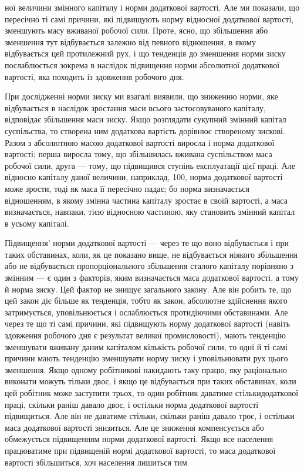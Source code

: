 ної величини змінного капіталу і норми додаткової вартості. Але ми показали, що пересічно ті самі
причини, які підвищують норму відносної додаткової вартості, зменшують масу вживаної робочої сили.
Проте, ясно, що збільшення або зменшення тут відбувається залежно від певного відношення, в якому
відбувається цей протилежний рух, і що тенденція до зменшення норми зиску послаблюється зокрема в
наслідок підвищення норми абсолютної додаткової вартості, яка походить із здовження робочого дня.

При дослідженні норми зиску ми взагалі виявили, що зниженню норми, яке відбувається в наслідок
зростання маси всього застосовуваного капіталу, відповідає збільшення маси зиску. Якщо розглядати
сукупний змінний капітал суспільства, то
створена ним додаткова вартість дорівнює створеному зискові. Разом з абсолютною масою додаткової
вартості виросла і норма додаткової вартості; перша виросла тому, що збільшилась вживана
суспільством маса робочої сили, друга — тому, що підвищився ступінь експлуатації цієї праці. Але
відносно капіталу даної величини, наприклад, 100, норма додаткової вартості може зрости, тоді як
маса її пересічно падає; бо норма визначається відношенням, в якому змінна частина капіталу зростає
в своїй вартості, а маса визначається, навпаки, тією відносною частиною, яку становить змінний
капітал в усьому капіталі.

Підвищення' норми додаткової вартості — через те що воно відбувається і при таких обставинах, коли,
як це показано вище, не відбувається ніякого збільшення або не відбувається пропорціонального
збільшення сталого капіталу порівняно з змінним — є один з факторів, яким визначається маса
додаткової вартості, а тому й норма зиску. Цей фактор не знищує загального закону. Але він робить
те, що цей закон діє більше як тенденція, тобто як закон, абсолютне здійснення якого затримується,
уповільнюється і ослаблюється протидіючими обставинами. Але через те що ті самі причини, які
підвищують норму додаткової вартості (навіть здовження робочого дня є результат великої
промисловості), мають тенденцію зменшувати вживану даним капіталом кількість робочої сили, то одні й
ті самі причини мають тенденцію зменшувати норму зиску і уповільнювати рух цього зменшення. Якщо
одному робітникові накидають таку працю, яку раціонально виконати можуть тільки двоє, і якщо це
відбувається при таких обставинах, коли цей робітник може заступити трьох, то один робітник даватиме
стількидодаткової праці, скільки раніш давало двоє, і остільки норма додаткової вартості
підвищиться. Але він не даватиме стільки, скільки раніш давало троє, і остільки маса додаткової
вартості знизиться. Але це зниження компенсується або обмежується підвищенням норми додаткової
вартості. Якщо все населення працюватиме при підвищеній нормі додаткової вартості, то маса
додаткової вартості збільшиться, хоч населення лишиться тим
